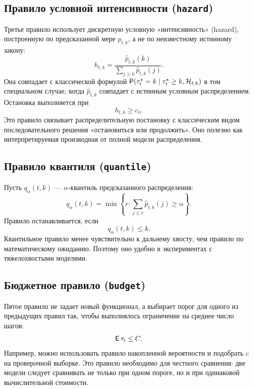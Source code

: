 \subsection{Правило условной интенсивности (\texttt{hazard})}

Третье правило использует дискретную условную «интенсивность» (hazard), построенную по
предсказанной мере \(\widehat p_{t,k}\), а не по неизвестному истинному закону:
\begin{equation}
  h_{t,k}
  =\frac{\widehat p_{t,k}(k)}{\sum_{j\ge k}\widehat p_{t,k}(j)}.
  \label{eq:hazard_rule}
\end{equation}
Она совпадает с классической формулой \(\mathsf{P}(\tau_t^\star=k\mid \tau_t^\star\ge k,\mathcal{H}_{t,k})\) в
том специальном случае, когда \(\widehat p_{t,k}\) совпадает с истинным условным распределением.
Остановка выполняется при
\begin{equation}
  h_{t,k}\ge c_h.
  \label{eq:hazard_threshold}
\end{equation}
Это правило связывает распределительную постановку с классическим видом последовательного решения
«остановиться или продолжить». Оно полезно как интерпретируемая производная от полной модели
распределения.

\subsection{Правило квантиля (\texttt{quantile})}

Пусть \(q_\alpha(t,k)\) --- \(\alpha\)-квантиль предсказанного распределения:
\begin{equation}
  q_\alpha(t,k)=\min\left\{r:\sum_{j\le r}\widehat p_{t,k}(j)\ge \alpha\right\}.
  \label{eq:quantile}
\end{equation}
Правило останавливается, если
\begin{equation}
  q_\alpha(t,k)\le k.
  \label{eq:quantile_rule}
\end{equation}
Квантильное правило менее чувствительно к дальнему хвосту, чем правило по математическому
ожиданию. Поэтому оно удобно в экспериментах с тяжелохвостыми моделями.

\subsection{Бюджетное правило (\texttt{budget})}

Пятое правило не задает новый функционал, а выбирает порог для одного из предыдущих правил так,
чтобы выполнялось ограничение на среднее число шагов:
\begin{equation}
  \operatorname{\mathsf{E}}\tau_t\le C.
  \label{eq:budget_constraint}
\end{equation}
Например, можно использовать правило накопленной вероятности и подобрать \(c\) на проверочной
выборке. Это правило необходимо для честного сравнения: две модели следует сравнивать не только
при одном пороге, но и при одинаковой вычислительной стоимости.

